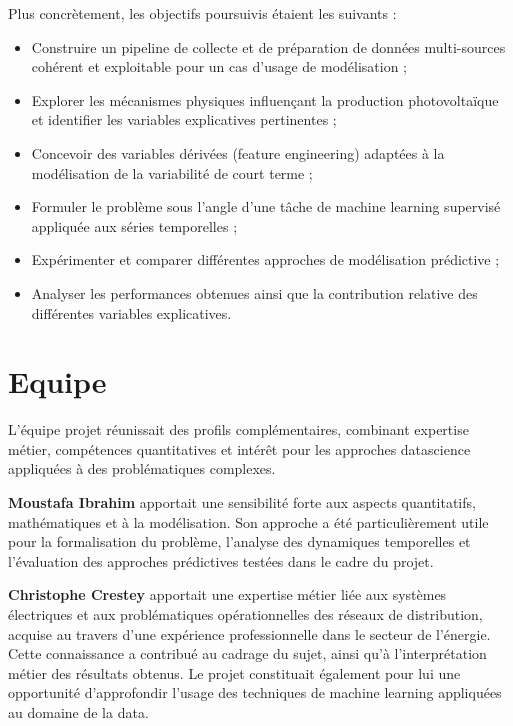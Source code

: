 Plus concrètement, les objectifs poursuivis étaient les suivants :

\begin{itemize}
\item ​Construire un pipeline de collecte et de préparation de données multi-sources cohérent et exploitable
pour un cas d’usage de modélisation ;

\item Explorer les mécanismes physiques influençant la production photovoltaïque et identifier les
variables explicatives pertinentes ;

\item Concevoir des variables dérivées (feature engineering) adaptées à la modélisation de la variabilité de
court terme ;

\item Formuler le problème sous l’angle d’une tâche de machine learning supervisé appliquée aux séries
temporelles ;

\item Expérimenter et comparer différentes approches de modélisation prédictive ;

\item Analyser les performances obtenues ainsi que la contribution relative des différentes variables
explicatives.
\end{itemize}

\clearpage

\section{Equipe}

L’équipe projet réunissait des profils complémentaires, combinant expertise métier, compétences
quantitatives et intérêt pour les approches datascience appliquées à des problématiques complexes.

\textbf{Moustafa Ibrahim} apportait une sensibilité forte aux aspects quantitatifs, mathématiques et à la
modélisation. Son approche a été particulièrement utile pour la formalisation du problème, l’analyse des
dynamiques temporelles et l’évaluation des approches prédictives testées dans le cadre du projet.

\textbf{Christophe Crestey} apportait une expertise métier liée aux systèmes électriques et aux problématiques
opérationnelles des réseaux de distribution, acquise au travers d’une expérience professionnelle dans le
secteur de l’énergie. Cette connaissance a contribué au cadrage du sujet, ainsi qu’à l’interprétation
métier des résultats obtenus. Le projet constituait également pour lui une opportunité d’approfondir
l’usage des techniques de machine learning appliquées au domaine de la data.

